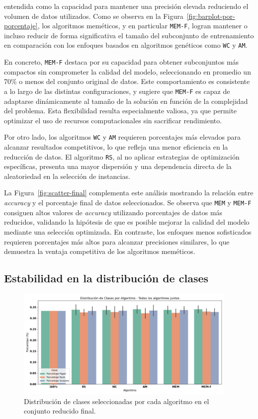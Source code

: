 entendida como la capacidad para mantener una precisión elevada reduciendo el volumen de datos utilizados.
Como se observa en la Figura~\ref{fig:barplot-por-porcentaje}, los algoritmos meméticos, y en particular \texttt{MEM-F},
logran mantener o incluso reducir de forma significativa el tamaño del subconjunto de entrenamiento en comparación con
los enfoques basados en algoritmos genéticos como \texttt{WC} y \texttt{AM}.

En concreto, \texttt{MEM-F} destaca por su capacidad para obtener subconjuntos más compactos sin comprometer la calidad del modelo,
seleccionando en promedio un 70\% o menos del conjunto original de datos.
Este comportamiento es consistente a lo largo de las distintas configuraciones,
y sugiere que \texttt{MEM-F} es capaz de adaptarse dinámicamente al tamaño de la solución en función de la complejidad del problema.
Esta flexibilidad resulta especialmente valiosa, ya que permite optimizar el uso de recursos computacionales sin sacrificar rendimiento.

Por otro lado, los algoritmos \texttt{WC} y \texttt{AM} requieren porcentajes más elevados para alcanzar resultados competitivos,
lo que refleja una menor eficiencia en la reducción de datos.
El algoritmo \texttt{RS}, al no aplicar estrategias de optimización específicas,
presenta una mayor dispersión y una dependencia directa de la aleatoriedad en la selección de instancias.

La Figura~\ref{fig:scatter-final} complementa este análisis mostrando la relación entre \textit{accuracy} y el porcentaje final de datos seleccionados.
Se observa que \texttt{MEM} y \texttt{MEM-F} consiguen altos valores de \textit{accuracy} utilizando porcentajes de datos más reducidos,
validando la hipótesis de que es posible mejorar la calidad del modelo mediante una selección optimizada.
En contraste, los enfoques menos sofisticados requieren porcentajes más altos para alcanzar precisiones similares,
lo que demuestra la ventaja competitiva de los algoritmos meméticos.

\subsection{Estabilidad en la distribución de clases}\label{sec:distribucion-clases-final}
\begin{figure}[htp]
    \centering
    \includegraphics[width=0.95\textwidth]{imagenes/evaluaciones/final/distribucion-de-clases}
    \caption{Distribución de clases seleccionadas por cada algoritmo en el conjunto reducido final.}
    \label{fig:distribucion-de-clases-final}
\end{figure}

